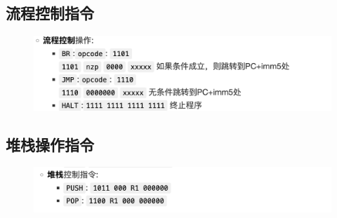 \documentclass{article}
\begin{document}
\subsection{流程控制指令}
\begin{figure}[H]
    \centering
    \includegraphics[width=1\textwidth]{pic/24.png}
   
    \end{figure}

\subsection{堆栈操作指令}
\begin{figure}[H]
    \centering
    \includegraphics[width=1\textwidth]{pic/25.png}
   
    \end{figure}
\end{document}
